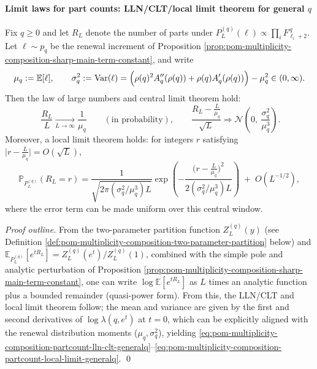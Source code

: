 \paragraph{Limit laws for part counts: LLN/CLT/local limit theorem for general \texorpdfstring{$q$}{q}}
\begin{theorem}\label{thm:pom-multiplicity-composition-partcount-generalq-llt}
Fix \(q\ge 0\) and let \(R_L\) denote the number of parts under \(P_L^{(q)}(\boldsymbol{\ell})\propto \prod_i F_{\ell_i+2}^{\,q}\).
Let \(\ell\sim p_q\) be the renewal increment of Proposition \ref{prop:pom-multiplicity-composition-sharp-main-term-constant},
and write
\[
\mu_q:=\mathbb{E}[\ell],\qquad
\sigma_q^2:=\mathrm{Var}(\ell)=\Bigl(\rho(q)^2A_q''(\rho(q))+\rho(q)A_q'(\rho(q))\Bigr)-\mu_q^2\in(0,\infty).
\]
Then the law of large numbers and central limit theorem hold:
\begin{equation}\label{eq:pom-multiplicity-composition-partcount-lln-clt-generalq}
\boxed{\;
\frac{R_L}{L}\xrightarrow[L\to\infty]{}\frac{1}{\mu_q}\qquad(\text{in probability}),\qquad
\frac{R_L-\frac{L}{\mu_q}}{\sqrt{L}}\Longrightarrow \mathcal{N}\!\left(0,\ \frac{\sigma_q^2}{\mu_q^{3}}\right).}
\end{equation}
Moreover, a local limit theorem holds: for integers \(r\) satisfying \(\bigl|r-\frac{L}{\mu_q}\bigr|=O(\sqrt{L})\),
\begin{equation}\label{eq:pom-multiplicity-composition-partcount-local-limit-generalq}
\mathbb{P}_{P_L^{(q)}}(R_L=r)
=\frac{1}{\sqrt{2\pi(\sigma_q^2/\mu_q^3)L}}
\exp\!\left(-\frac{\bigl(r-\frac{L}{\mu_q}\bigr)^2}{2(\sigma_q^2/\mu_q^3)L}\right)
\;+\;O(L^{-1/2}),
\end{equation}
where the error term can be made uniform over this central window.
\end{theorem}
\begin{proof}[Proof outline]
From the two-parameter partition function \(Z_L^{(q)}(y)\) (see Definition \ref{def:pom-multiplicity-composition-two-parameter-partition} below) and
\(
\mathbb{E}_{P_L^{(q)}}[e^{tR_L}]=Z_L^{(q)}(e^t)/Z_L^{(q)}(1)
\),
combined with the simple pole and analytic perturbation of Proposition \ref{prop:pom-multiplicity-composition-sharp-main-term-constant},
one can write \(\log \mathbb{E}[e^{tR_L}]\) as \(L\) times an analytic function plus a bounded remainder (quasi-power form).
From this, the LLN/CLT and local limit theorem follow;
the mean and variance are given by the first and second derivatives of \(\log\lambda(q,e^t)\) at \(t=0\),
which can be explicitly aligned with the renewal distribution moments (\(\mu_q,\sigma_q^2\)), yielding \eqref{eq:pom-multiplicity-composition-partcount-lln-clt-generalq}--\eqref{eq:pom-multiplicity-composition-partcount-local-limit-generalq}. \qed
\end{proof}

